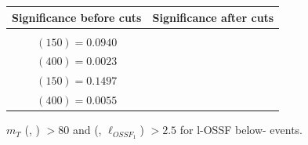 \documentclass[letterpaper,12pt]{article}
\begin{document}
\begin{figure}[h!]
{  }
  \makebox[\textwidth][c]{%
    \rule{0pt}{0.6cm}
    }
  \tiny
  \setlength{\tabcolsep}{20pt}
  \renewcommand{\arraystretch}{1.6}
  \begin{tabular}{|c|c|}
    \hline
    Significance before cuts & Significance after cuts\\
    \hline
    \Gape[0.2cm]{\makecell{
        \sig{} $(100) = 0.1192$\\
        \sig{} $(150) = 0.0940$\\
        \sig{} $(400) = 0.0023$ }} & 
    \makecell{
      \sig{} $(100) = 0.1828$\\
      \sig{} $(150) = 0.1497$\\
      \sig{} $(400) = 0.0055$}\\
    \hline
  \end{tabular}
  \caption[\3l-OSSF Cut-2: $m_{T}$ (\ll, \met) $>80$ and \dphi{} (\lodd, $\ell_{OSSF_{1}}$) $>2.5$]{ $m_{T}$ (\ll, \met) $>80$ and \dphi{} (\lodd, $\ell_{OSSF_{1}}$) $>2.5$ for \3l-OSSF below-\Zboson{} events.}
  \label{fig:3lc3}
  \vspace{4cm}
\end{figure}
\end{document}
